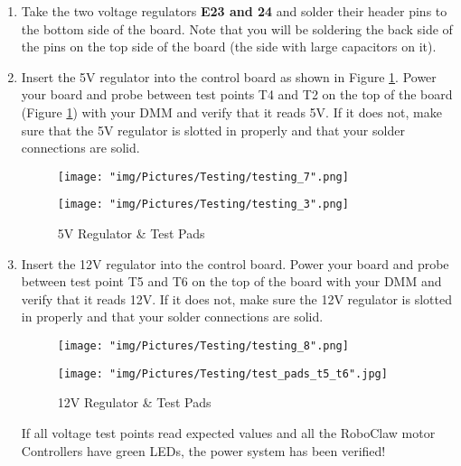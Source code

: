 \documentclass{article}
\begin{document}
\begin{enumerate}
\item Take the two voltage regulators \textbf{E23 and 24} and solder their header pins to the bottom side of the board.  Note that you will be soldering the back side of the pins on the top side of the board (the side with large capacitors on it). 

\item Insert the 5V regulator into the control board as shown in Figure \ref{test_5}. Power your board and probe between test points T4 and T2 on the top of the board (Figure \ref{test_5}) with your DMM and verify that it reads 5V. If it does not, make sure that the 5V regulator is slotted in properly and that your solder connections are solid.

\begin{figure}[H]
  \centering
  \begin{minipage}[b]{0.45\textwidth}
    \texttt{[image: "img/Pictures/Testing/testing\_7".png]}
  \end{minipage}
  \hfill
  \begin{minipage}[b]{0.45\textwidth}
    \texttt{[image: "img/Pictures/Testing/testing\_3".png]}
  \end{minipage}
  \caption{5V Regulator \& Test Pads}
  \label{test_5}
\end{figure}

\item Insert the 12V regulator into the control board. Power your board and probe between test point T5 and T6 on the top of the board with your DMM and verify that it reads 12V. If it does not, make sure the 12V regulator is slotted in properly and that your solder connections are solid.

\begin{figure}[H]
  \centering
  \begin{minipage}[b]{0.45\textwidth}
    \texttt{[image: "img/Pictures/Testing/testing\_8".png]}
  \end{minipage}
  \hfill
  \begin{minipage}[b]{0.45\textwidth}
    \texttt{[image: "img/Pictures/Testing/test\_pads\_t5\_t6".jpg]}
  \end{minipage}
  \caption{12V Regulator \& Test Pads}
  \label{test_6}
\end{figure}

If all voltage test points read expected values and all the RoboClaw motor Controllers have green LEDs, the power system has been verified! 

\end{enumerate}
\end{document}
